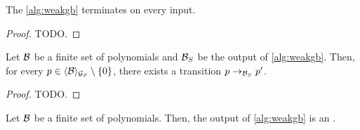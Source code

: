\begin{lemma}
    \label{lem:weakgb-terminates}
    The \cref{alg:weakgb} terminates on every input.
\end{lemma}
\begin{proof}
  TODO.
\end{proof}

\begin{lemma}
    \label{lem:weakgb-correct}
    Let $\Basis$ be a finite set of polynomials
    and $\Basis_S$ be the output of \cref{alg:weakgb}.
    Then, for every $p \in \gen{\Basis}{\group_S} \setminus \set{ 0 }$,
    there exists
    a transition $p \reducstep{\Basis_S} p'$.
\end{lemma}
\begin{proof}
    TODO.
\end{proof}

\begin{theorem}
    \label{thm:weakgb}
    Let $\Basis$ be a finite set of polynomials.
    Then, the output of \cref{alg:weakgb} is an .
\end{theorem}
